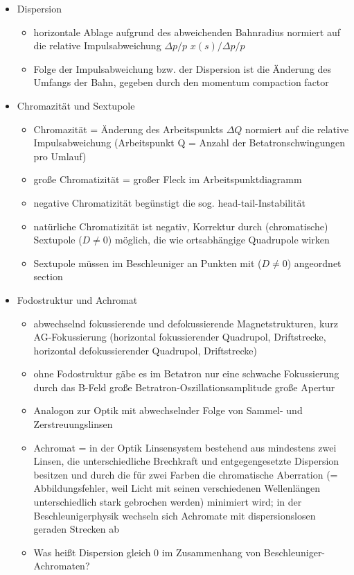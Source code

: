 \documentclass[11pt,a4paper]{article}
\begin{document}
\begin{itemize}
        \item Dispersion
            \begin{itemize}
                \item horizontale Ablage aufgrund des abweichenden Bahnradius normiert auf die relative Impulsabweichung \( \Delta p/p \) \( x(s) / \Delta p /p \)
                \item Folge der Impulsabweichung bzw. der Dispersion ist die Änderung des Umfangs der Bahn, gegeben durch den momentum compaction factor
            \end{itemize}
        \item Chromazität und Sextupole
            \begin{itemize}
                \item Chromazität = Änderung des Arbeitspunkts \( \Delta Q\) normiert auf die relative Impulsabweichung 
                (Arbeitspunkt Q = Anzahl der Betatronschwingungen pro Umlauf)
                \item große Chromatizität = großer Fleck im Arbeitspunktdiagramm
                \item negative Chromatizität begünstigt die sog. head-tail-Instabilität
                \item natürliche Chromatizität ist negativ, Korrektur durch (chromatische) Sextupole (\(D \neq 0\)) möglich, die wie ortsabhängige 
                Quadrupole wirken
                \item Sextupole müssen im Beschleuniger an Punkten mit (\(D \neq 0\)) angeordnet section
            \end{itemize}
        \item Fodostruktur und Achromat
            \begin{itemize}
                \item abwechselnd fokussierende und defokussierende Magnetstrukturen, kurz AG-Fokussierung (horizontal fokussierender Quadrupol, Driftstrecke, 
                horizontal defokussierender Quadrupol, Driftstrecke)
                \item ohne Fodostruktur gäbe es im Betatron nur eine schwache Fokussierung durch das B-Feld 
                \rightarrow große Betratron-Oszillationsamplitude \rightarrow große Apertur
                \item Analogon zur Optik mit abwechselnder Folge von Sammel- und Zerstreuungslinsen
                \item Achromat = in der Optik Linsensystem bestehend aus mindestens zwei Linsen, die unterschiedliche Brechkraft und entgegengesetzte 
                Dispersion besitzen und durch die für zwei Farben die chromatische Aberration (= Abbildungsfehler, weil Licht mit seinen 
                verschiedenen Wellenlängen unterschiedlich stark gebrochen werden) minimiert wird; in der Beschleunigerphysik wechseln sich Achromate
                mit dispersionslosen geraden Strecken ab
                \item Was heißt Dispersion gleich 0 im Zusammenhang von Beschleuniger-Achromaten?
            \end{itemize}
    \end{itemize}
\end{document}
